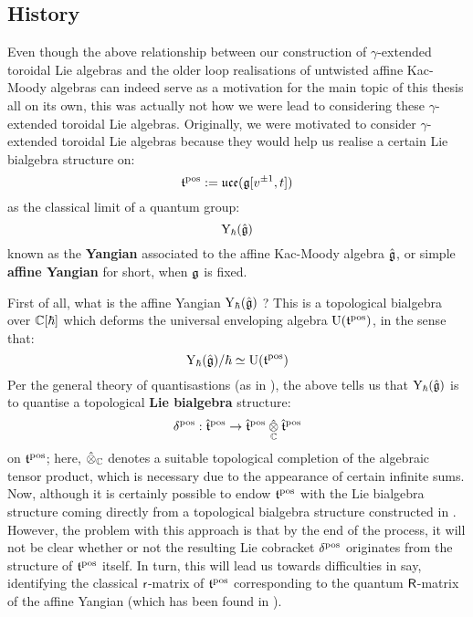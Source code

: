     \subsection{History} \label{subsection: history}
        Even though the above relationship between our construction of $\gamma$-extended toroidal Lie algebras and the older loop realisations of untwisted affine Kac-Moody algebras can indeed serve as a motivation for the main topic of this thesis all on its own, this was actually not how we were lead to considering these $\gamma$-extended toroidal Lie algebras. Originally, we were motivated to consider $\gamma$-extended toroidal Lie algebras because they would help us realise a certain Lie bialgebra structure on:
            $$\mathfrak{t}^{\mathrm{pos}} := \mathfrak{uce}(\mathfrak{g}[v^{\pm 1}, t])$$
        as the classical limit of a quantum group:
            $$\mathrm{Y}_{\hbar}(\hat{\mathfrak{g}})$$
        known as the \textbf{Yangian} associated to the affine Kac-Moody algebra $\hat{\mathfrak{g}}$, or simple  \textbf{affine Yangian} for short, when $\mathfrak{g}$ is fixed.
        
        First of all, what is the affine Yangian $\mathrm{Y}_{\hbar}(\hat{\mathfrak{g}})$ ? This is a topological bialgebra over $\mathbb{C}[\hbar]$ which deforms the universal enveloping algebra $\mathrm{U}(\mathfrak{t}^{\mathrm{pos}})$, in the sense that:
            $$\mathrm{Y}_{\hbar}(\hat{\mathfrak{g}})/\hbar \simeq \mathrm{U}(\mathfrak{t}^{\mathrm{pos}})$$
        Per the general theory of quantisastions (as in \cite{etingof_kazhdan_quantisation_1}), the above tells us that $\mathrm{Y}_{\hbar}(\hat{\mathfrak{g}})$ is to quantise a topological \textbf{Lie bialgebra} structure:
            $$\delta^{\positive}: \extendedtoroidal^{\positive} \to \extendedtoroidal^{\positive} \hattensor_{\bbC} \extendedtoroidal^{\positive}$$
        on $\mathfrak{t}^{\mathrm{pos}}$; here, $\hattensor_{\bbC}$ denotes a suitable topological completion of the algebraic tensor product, which is necessary due to the appearance of certain infinite sums. Now, although it is certainly possible to endow $\mathfrak{t}^{\mathrm{pos}}$ with the Lie bialgebra structure coming directly from a topological bialgebra structure constructed in \cite{guay_nakajima_wendlandt_affine_yangian_coproduct}. However, the problem with this approach is that by the end of the process, it will not be clear whether or not the resulting Lie cobracket $\delta^{\mathrm{pos}}$ originates from the structure of $\mathfrak{t}^{\mathrm{pos}}$ itself. In turn, this will lead us towards difficulties in say, identifying the classical $\mathsf{r}$-matrix of $\mathfrak{t}^{\mathrm{pos}}$ corresponding to the quantum $\mathsf{R}$-matrix of the affine Yangian (which has been found in \cite{appel_gautam_wendlandt_R_matrices_of_affine_yangians}).
        
